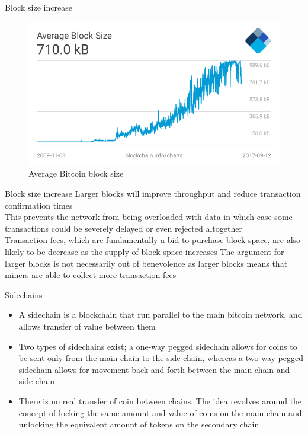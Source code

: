 \documentclass[9pt]{beamer}
\begin{document}
\begin{frame}{Block size increase}
	\begin{figure}[]
		\centering
		\includegraphics  [width=4.in]{Images/blocksize}
		\caption{Average Bitcoin block size}
	\end{figure}
\end{frame}


\begin{frame}{Block size increase}
	Larger blocks will improve throughput and reduce transaction confirmation times \\ \vspace{3mm}
	This prevents the network from being overloaded with data in which case some transactions could be severely delayed or even rejected altogether\\ \vspace{3mm}
	Transaction fees, which are fundamentally a bid to purchase block space, are also likely to be decrease as the supply of block space increases
	The argument for larger blocks is not necessarily out of benevolence as larger blocks means that miners are able to collect more transaction fees \\ \vspace{3mm}
\end{frame}


\begin{frame}{Sidechains}
	\begin{itemize}
		\item A sidechain is a blockchain that run parallel to the main bitcoin network, and allows transfer of value between them
		\item Two types of sidechains exist; a one-way pegged sidechain allows for coins to be sent only from the main chain to the side chain, whereas a two-way pegged sidechain allows for movement back and forth between the main chain and side chain
		\item There is no real transfer of coin between chains. The idea revolves around the concept of locking the same amount and value of coins on the main chain and unlocking the equivalent amount of tokens on the secondary chain
	\end{itemize}
\end{frame}
\end{document}
